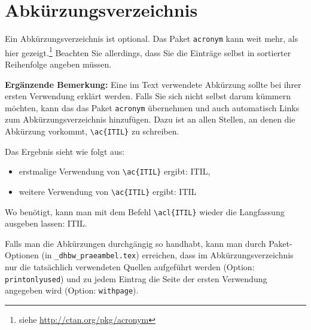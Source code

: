 \chapter*{Abkürzungsverzeichnis}

Ein Abkürzungsverzeichnis ist optional. Das Paket \verb|acronym| kann weit mehr, als hier gezeigt.\footnote{siehe \url{http://ctan.org/pkg/acronym}}
Beachten Sie allerdings, dass Sie die Einträge selbst in sortierter Reihenfolge angeben müssen.

\begin{acronym}[DHBW] 
\end{acronym}

\vspace{2em}
{\footnotesize
\textbf{Ergänzende Bemerkung:}
Eine im Text verwendete Abkürzung sollte bei ihrer ersten Verwendung erklärt werden. Falls Sie sich nicht selbst darum kümmern möchten, kann das das Paket \verb|acronym| übernehmen und auch automatisch Links zum Abkürzungsverzeichnis hinzufügen. Dazu ist an allen Stellen, an denen die Abkürzung vorkommt, \verb|\ac{ITIL}| zu schreiben. 

Das Ergebnis sieht wie folgt aus: 
\begin{itemize}
\item erstmalige Verwendung von \verb|\ac{ITIL}| ergibt: \ac{ITIL},
\item weitere Verwendung von \verb|\ac{ITIL}| ergibt: \ac{ITIL}
\end{itemize}
Wo benötigt, kann man mit dem Befehl \verb|\acl{ITIL}| wieder die Langfassung ausgeben lassen: \acl{ITIL}.

Falls man die Abkürzungen durchgängig so handhabt, kann man durch Paket-Optionen (in \verb|_dhbw_praeambel.tex|)
erreichen, dass im Abkürzungsverzeichnis nur die tatsächlich verwendeten Quellen aufgeführt werden (Option: \verb|printonlyused|) und zu jedem Eintrag die Seite der ersten Verwendung angegeben wird (Option: \verb|withpage|).
}
